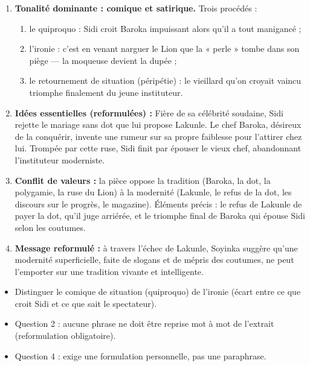 \documentclass[11pt]{article}
\newcommand{\cle}[1]{{\popxbold\color{popdark}#1}}
\begin{document}
\begin{corrige}
\begin{enumerate}
\item \textbf{Tonalité dominante : \cle{comique} et \cle{satirique}.} Trois procédés :
\begin{enumerate}
\item[a)] le \cle{quiproquo} : Sidi croit Baroka impuissant alors qu'il a tout manigancé ;
\item[b)] l'\cle{ironie} : c'est en venant narguer le Lion que la « perle » tombe dans son piège — la \cle{moqueuse devient la dupée} ;
\item[c)] le \cle{retournement de situation} (\cle{péripétie}) : le vieillard qu'on croyait vaincu triomphe finalement du jeune instituteur.
\end{enumerate}
\item \textbf{Idées essentielles (\cle{reformulées}) :} Fière de sa célébrité soudaine, Sidi rejette le mariage sans dot que lui propose Lakunle. Le chef Baroka, désireux de la conquérir, invente une rumeur sur sa propre faiblesse pour l'attirer chez lui. Trompée par cette ruse, Sidi finit par épouser le vieux chef, abandonnant l'instituteur moderniste.
\item \textbf{Conflit de valeurs :} la pièce oppose la \cle{tradition} (Baroka, la \cle{dot}, la \cle{polygamie}, la ruse du Lion) à la \cle{modernité} (Lakunle, le \cle{refus de la dot}, les discours sur le \cle{progrès}, le magazine). Éléments précis : le refus de Lakunle de payer la dot, qu'il juge arriérée, et le triomphe final de Baroka qui épouse Sidi selon les \cle{coutumes}.
\item \textbf{Message \cle{reformulé} :} à travers l'échec de Lakunle, Soyinka suggère qu'une modernité \cle{superficielle}, faite de slogans et de mépris des coutumes, ne peut l'emporter sur une tradition \cle{vivante} et \cle{intelligente}.
\end{enumerate}
\begin{attention}
\begin{itemize}
\item Distinguer le \cle{comique de situation} (quiproquo) de l'\cle{ironie} (écart entre ce que croit Sidi et ce que sait le spectateur).
\item Question 2 : aucune phrase ne doit être reprise mot à mot de l'extrait (\cle{reformulation} obligatoire).
\item Question 4 : exige une formulation \cle{personnelle}, pas une paraphrase.
\end{itemize}
\end{attention}
\end{corrige}
\end{document}
